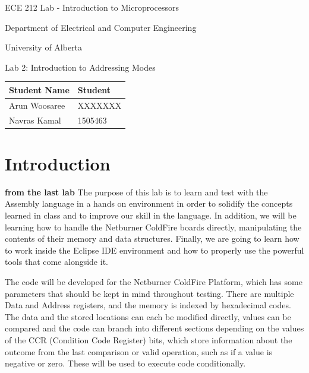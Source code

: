 \documentclass[letterpaper]{article}
\begin{document}
  \begin{titlepage}
    \begin{center}

      \LARGE
      ECE 212 Lab - Introduction to Microprocessors

      Department of Electrical and Computer Engineering

      University of Alberta

      \vspace{2cm}

      Lab 2: Introduction to Addressing Modes

      \vspace{5cm}
      \Large

      \begin{tabular}{ | m{5cm} | m{5cm} | }
        \hline
        Student Name & Student \\
        \hline
        Arun Woosaree & XXXXXXX \\
        \hline
        Navras Kamal & 1505463 \\
        \hline
      \end{tabular}

    \end{center}
\end{titlepage}


\tableofcontents

\newpage

\section{Introduction}
\textbf{from the last lab}
  The purpose of this lab is to learn and test with the Assembly language in a
  hands on environment in order to solidify the concepts learned in class and to
  improve our skill in the language.  In addition, we will be learning how to
  handle the Netburner ColdFire boards directly, manipulating the contents of
  their memory and data structures.  Finally, we are going to learn how to work
  inside the Eclipse IDE environment and how to properly use the powerful tools
  that come alongside it.

  The code will be developed for the Netburner ColdFire Platform, which has some
  parameters that should be kept in mind throughout testing.  There are multiple
  Data and Address registers, and the memory is indexed by hexadecimal codes.
  The data and the stored locations can each be modified directly, values can be
  compared and the code can branch into different sections depending on the
  values of the CCR (Condition Code Register) bits, which store information
  about the outcome from the last comparison or valid operation, such as if a
  value is negative or zero.  These will be used to execute code conditionally.
\end{document}
